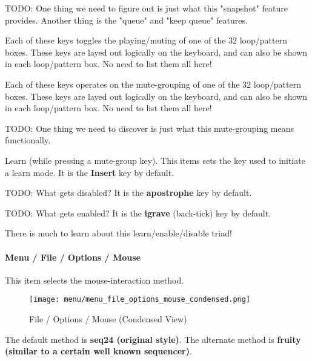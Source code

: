    TODO:  
   One thing we need to figure out is just what this "snapshot"
   feature provides.
   Another thing is the "queue" and "keep queue" features.

   Each of these keys toggles the playing/muting of one of the 32
   loop/pattern boxes.  These keys are layed out logically on the keyboard,
   and can also be shown in each loop/pattern box.  No need to list them all
   here!

   Each of these keys operates on the mute-grouping of one of the 32
   loop/pattern boxes.  These keys are layed out logically on the keyboard,
   and can also be shown in each loop/pattern box.  No need to list them all
   here!

   TODO: 
   One thing we need to discover is just what this mute-grouping
   means functionally.

   Learn (while pressing a mute-group key).
   This items sets the key used to initiate a learn mode.
   It is the \textbf{Insert} key by default.

   TODO:  What gets disabled?
   It is the \textbf{apostrophe} key by default.

   TODO: What gets enabled?
   It is the \textbf{igrave} (back-tick) key by default.

   There is much to learn about this learn/enable/disable triad!

\paragraph{Menu / File / Options / Mouse }
\label{paragraph:seq24_menu_file_options_mouse}

   This item selects the mouse-interaction method.

\begin{figure}[H]
   \centering 
   \texttt{[image: menu/menu\_file\_options\_mouse\_condensed.png]}
   \caption{File / Options / Mouse (Condensed View)}
   \label{fig:seq24_menu_file_options_mouse}
\end{figure}

   The default method is \textbf{seq24 (original style)}.
   The alternate method is \textbf{fruity (similar to a certain well known
   sequencer)}.

